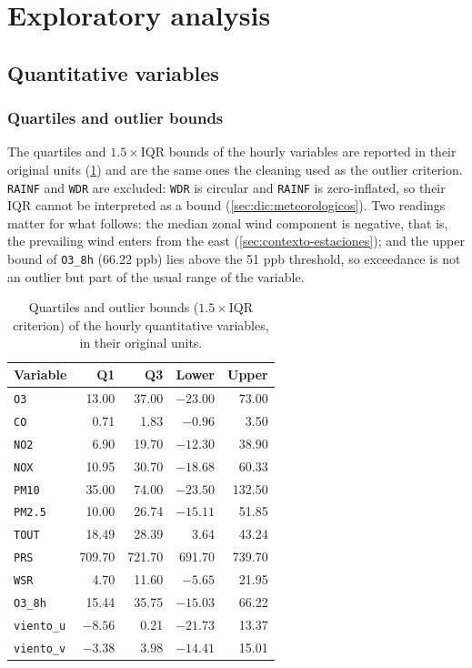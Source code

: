 \section{Exploratory analysis}
\label{sec:eda}

\subsection{Quantitative variables}

\subsubsection{Quartiles and outlier bounds}

The quartiles and $1.5\times$IQR bounds of the hourly variables are reported
in their original units (\cref{tab:cuartiles-iqr}) and are the same ones the
cleaning used as the outlier criterion. \texttt{RAINF} and \texttt{WDR} are
excluded: \texttt{WDR} is circular and \texttt{RAINF} is zero-inflated, so
their IQR cannot be interpreted as a bound (\cref{sec:dic:meteorologicos}).
Two readings matter for what follows: the median zonal wind component is
negative, that is, the prevailing wind enters from the east
(\cref{sec:contexto-estaciones}); and the upper bound of \texttt{O3\_8h}
(66.22 ppb) lies above the 51 ppb threshold, so exceedance is not an outlier
but part of the usual range of the variable.

\begin{table}[pos=t]
  \centering
  \caption{Quartiles and outlier bounds ($1.5\times$IQR criterion) of the
    hourly quantitative variables, in their original units.}
  \label{tab:cuartiles-iqr}
  \small
  \begin{tabular}{lrrrr}
    \toprule
    Variable & Q1 & Q3 & Lower & Upper \\
    \midrule
    \texttt{O3}       &    13.00 &    37.00 &  $-23.00$ &    73.00 \\
    \texttt{CO}       &     0.71 &     1.83 &   $-0.96$ &     3.50 \\
    \texttt{NO2}      &     6.90 &    19.70 &  $-12.30$ &    38.90 \\
    \texttt{NOX}      &    10.95 &    30.70 &  $-18.68$ &    60.33 \\
    \texttt{PM10}     &    35.00 &    74.00 &  $-23.50$ &   132.50 \\
    \texttt{PM2.5}    &    10.00 &    26.74 &  $-15.11$ &    51.85 \\
    \texttt{TOUT}     &    18.49 &    28.39 &      3.64 &    43.24 \\
    \texttt{PRS}      &   709.70 &   721.70 &    691.70 &   739.70 \\
    \texttt{WSR}      &     4.70 &    11.60 &   $-5.65$ &    21.95 \\
    \texttt{O3\_8h}   &    15.44 &    35.75 &  $-15.03$ &    66.22 \\
    \texttt{viento\_u}&  $-8.56$ &     0.21 &  $-21.73$ &    13.37 \\
    \texttt{viento\_v}&  $-3.38$ &     3.98 &  $-14.41$ &    15.01 \\
    \bottomrule
  \end{tabular}
\end{table}

